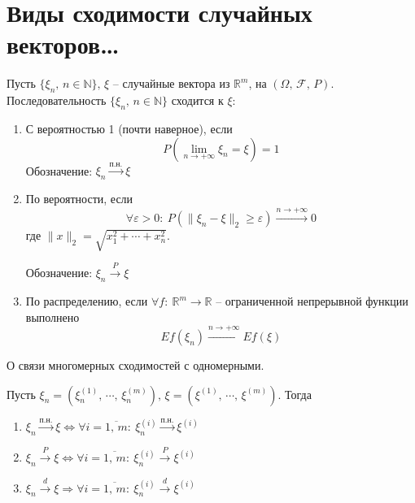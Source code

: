 \section{Виды сходимости случайных векторов\dots}
\begin{definition}
	Пусть $\{\xi_n,\, n \in \mathbb{N}\},\, \xi$ -- случайные вектора из $\mathbb{R}^m$, на $(\Omega,\, \mathcal{F},\, P)$. Последовательность $\{\xi_n,\, n \in \mathbb{N}\}$ сходится к $\xi$:
	\begin{enumerate}
		\item С вероятностью 1 (почти наверное), если
		      \[P\left(\lim_{n \to +\infty}\xi_n = \xi\right) = 1\]
		      Обозначение: $\xi_n \stackrel{\text{п.н.}}{\to} \xi$
		\item По вероятности, если
		      \[\forall \varepsilon > 0:\: P(\|\xi_n - \xi\|_2 \geq \varepsilon) \stackrel{n \to +\infty}{\to} 0\]
		      где $\|x\|_2 = \sqrt{x_1^2 + \cdots + x_n^2}$.

		      Обозначение: $\xi_n \stackrel{P}{\to} \xi$
		\item По распределению, если $\forall f:\: \mathbb{R}^m \to \mathbb{R}$ -- ограниченной непрерывной функции выполнено
		      \[Ef(\xi_n) \stackrel{n \to +\infty}{\to} Ef(\xi)\]
	\end{enumerate}
\end{definition}

\begin{lemma}
	О связи многомерных сходимостей с одномерными.

	Пусть $\xi_n = (\xi_n^{(1)},\,\cdots,\,\xi_n^{(m)}),\, \xi = (\xi^{(1)},\,\cdots,\,\xi^{(m)})$. Тогда
	\begin{enumerate}
		\item $\xi_n \stackrel{\text{п.н.}}{\to} \xi \Leftrightarrow \forall i = \overline{1,\,m}:\: \xi_n^{(i)} \stackrel{\text{п.н.}}{\to} \xi^{(i)}$
		\item $\xi_n \stackrel{P}{\to} \xi \Leftrightarrow \forall i = \overline{1,\,m}:\: \xi_n^{(i)} \stackrel{P}{\to} \xi^{(i)}$
		\item $\xi_n \stackrel{d}{\to} \xi \Rightarrow \forall i = \overline{1,\,m} :\: \xi_n^{(i)} \stackrel{d}{\to} \xi^{(i)}$
	\end{enumerate}
\end{lemma}

